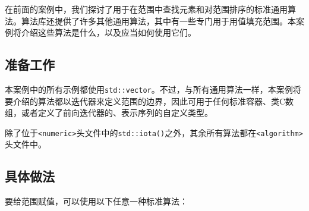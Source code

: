 
在前面的案例中，我们探讨了用于在范围中查找元素和对范围排序的标准通用算法。算法库还提供了许多其他通用算法，其中有一些专门用于用值填充范围。本案例将介绍这些算法是什么，以及应当如何使用它们。



\subsection{准备工作}



本案例中的所有示例都使用\texttt{std::\allowbreak{}vector}。不过，与所有通用算法一样，本案例将要介绍的算法都以迭代器来定义范围的边界，因此可用于任何标准容器、类C数组，或者定义了前向迭代器的、表示序列的自定义类型。



除了位于\texttt{<\allowbreak{}numeric>}头文件中的\texttt{std::\allowbreak{}iota()}之外，其余所有算法都在\texttt{<\allowbreak{}algorithm>}头文件中。



\subsection{具体做法}



要给范围赋值，可以使用以下任意一种标准算法：



